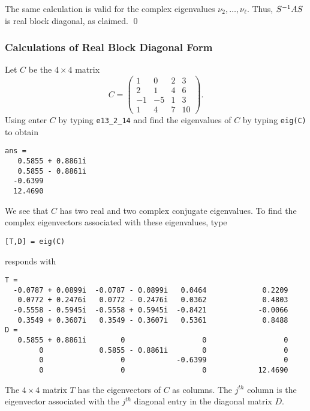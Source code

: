 The same calculation is valid for the complex eigenvalues 
$\nu_2,\ldots,\nu_\ell$.  Thus, $S^{-1} AS$ is real block diagonal, as 
claimed.   \qed


\subsubsection*{\Matlab Calculations of Real Block Diagonal Form}

Let $C$ be the $4\times 4$ matrix
\begin{equation*}
C =\left(\begin{array}{rrrr}  1 & 0 & 2 & 3 \\ 2 & 1 & 4 & 6\\
-1 & -5 & 1 & 3 \\ 1 & 4 & 7 & 10 \end{array}\right).
\end{equation*}
Using \Matlab enter $C$ by typing {\tt e13\_2\_14} and find the 
eigenvalues of $C$ by typing {\tt eig(C)} 
to obtain
\begin{verbatim}
ans =
   0.5855 + 0.8861i
   0.5855 - 0.8861i
  -0.6399          
  12.4690    
\end{verbatim}
We see that $C$ has two real and two complex conjugate eigenvalues.
To find the complex eigenvectors associated with these eigenvalues,
type 
\begin{verbatim}
[T,D] = eig(C)
\end{verbatim}
\Matlab responds with
\begin{verbatim}
T =
  -0.0787 + 0.0899i  -0.0787 - 0.0899i   0.0464             0.2209          
   0.0772 + 0.2476i   0.0772 - 0.2476i   0.0362             0.4803          
  -0.5558 - 0.5945i  -0.5558 + 0.5945i  -0.8421            -0.0066          
   0.3549 + 0.3607i   0.3549 - 0.3607i   0.5361             0.8488          
D =
   0.5855 + 0.8861i        0                  0                  0          
        0             0.5855 - 0.8861i        0                  0          
        0                  0            -0.6399                  0          
        0                  0                  0            12.4690          
\end{verbatim}
The $4\times 4$ matrix $T$ has the eigenvectors of $C$ as columns.
The $j^{th}$ column is the eigenvector associated with the $j^{th}$
diagonal entry in the diagonal matrix $D$. 

